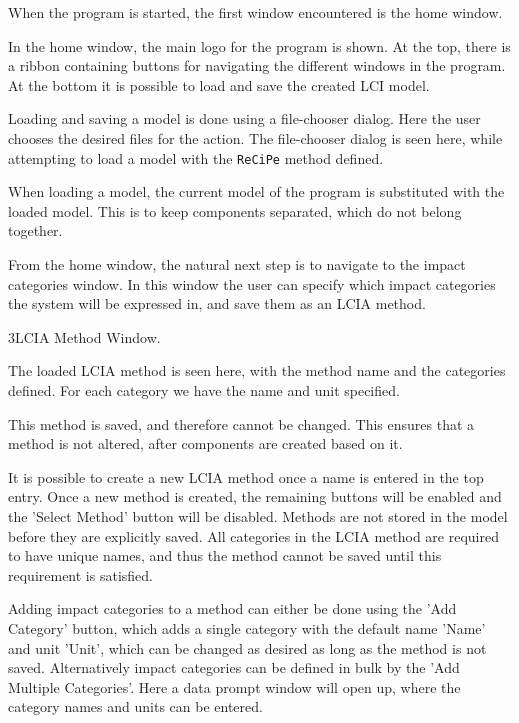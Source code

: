 When the program is started, the first window encountered is the home window. 


In the home window, the main logo for the program is shown. At the top, there is a ribbon containing buttons for navigating the different windows in the program. At the bottom it is possible to load and save the created LCI model. 

Loading and saving a model is done using a file-chooser dialog. Here the user chooses the desired files for the action. The file-chooser dialog is seen here, while attempting to load a model with the \texttt{ReCiPe} method defined.


When loading a model, the current model of the program is substituted with the loaded model. This is to keep components separated, which do not belong together.

From the home window, the natural next step is to navigate to the impact categories window. In this window the user can specify which impact categories the system will be expressed in, and save them as an LCIA method.

\guide
{3}{LCIA Method Window.}

The loaded LCIA method is seen here, with the method name and the categories defined. For each category we have the name and unit specified. 

This method is saved, and therefore cannot be changed. This ensures that a method is not altered, after components are created based on it.

It is possible to create a new LCIA method once a name is entered in the top entry. Once a new method is created, the remaining buttons will be enabled and the 'Select Method' button will be disabled. Methods are not stored in the model before they are explicitly saved. All categories in the LCIA method are required to have unique names, and thus the method cannot be saved until this requirement is satisfied.

Adding impact categories to a method can either be done using the 'Add Category' button, which adds a single category with the default name 'Name' and unit 'Unit', which can be changed as desired as long as the method is not saved. Alternatively impact categories can be defined in bulk by the 'Add Multiple Categories'. Here a data prompt window will open up, where the category names and units can be entered.

